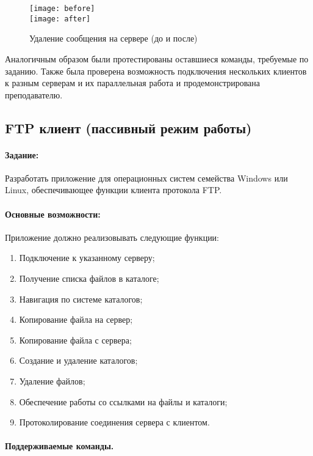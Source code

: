 \begin{figure}[H]
	\centering
	\texttt{[image: before]}
	\\[0.5cm]
	\texttt{[image: after]}
	\caption{Удаление сообщения на сервере (до и после)}
	\label{pic:popdelete}
\end{figure}

Аналогичным образом были протестированы оставшиеся команды, требуемые по заданию. Также была проверена возможность подключения нескольких клиентов к разным серверам и их параллельная работа и продемонстрирована преподавателю.

\subsection{FTP клиент (пассивный режим работы)}

\paragraph{Задание:}

Разработать приложение для операционных систем семейства Windows или Linux, обеспечивающее функции клиента протокола FTP.

\paragraph{Основные возможности:}

Приложение должно реализовывать следующие функции:

\begin{enumerate}
	\item Подключение к указанному серверу;
	\item Получение списка файлов в каталоге;
	\item Навигация по системе каталогов;
	\item Копирование файла на сервер;
	\item Копирование файла с сервера;
	\item Создание и удаление каталогов;
	\item Удаление файлов;
	\item Обеспечение работы со ссылками на файлы и каталоги;
	\item Протоколирование соединения сервера с клиентом.
\end{enumerate}

\paragraph{Поддерживаемые команды.}

